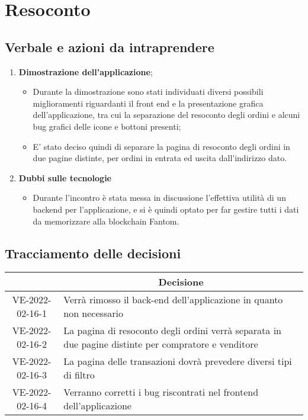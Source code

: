 \section{Resoconto}
\subsection{Verbale e azioni da intraprendere}

\begin{enumerate}
	\item \textbf{Dimostrazione dell'applicazione};
	\begin{itemize}
		\item Durante la dimostrazione sono stati individuati diversi possibili miglioramenti riguardanti
		 il front end e la presentazione grafica dell'applicazione, tra cui la separazione del 
		 resoconto degli ordini e alcuni bug grafici delle icone e bottoni presenti;
		\item E' stato deciso quindi di separare la pagina di resoconto degli ordini in due pagine distinte, per ordini in entrata ed uscita dall'indirizzo dato.
	\end{itemize}
	\item \textbf{Dubbi sulle tecnologie}
	\begin{itemize}
		\item Durante l'incontro è stata messa in discussione l'effettiva 
		utilità di un backend\glo{} per l'applicazione, e si è quindi optato per far
		 gestire tutti i dati da memorizzare alla blockchain\glo{} Fantom\glo{}.
	\end{itemize}
\end{enumerate}

\pagebreak

\subsection{Tracciamento delle decisioni}

\begin{table}[H]
	\centering
	\renewcommand{\arraystretch}{1.8}
	\begin{tabular}{c | p{10cm}}
		\rowcolor[HTML]{125E28}
		\multicolumn{1}{c}{\color[HTML]{FFFFFF} \textbf{ID}} &
		\multicolumn{1}{c}{\color[HTML]{FFFFFF} \textbf{Decisione}} \\
		\hline
		VE-2022-02-16-1 & Verrà rimosso il back-end dell'applicazione in quanto non necessario \\ \hline
		VE-2022-02-16-2 & La pagina di resoconto degli ordini verrà separata in due pagine distinte per compratore e venditore \\ \hline
		VE-2022-02-16-3 & La pagina delle transazioni dovrà prevedere diversi tipi di filtro \\ \hline
		VE-2022-02-16-4 & Verranno corretti i bug\glo{} riscontrati nel frontend\glo{} dell'applicazione \\
	\end{tabular}
\end{table}